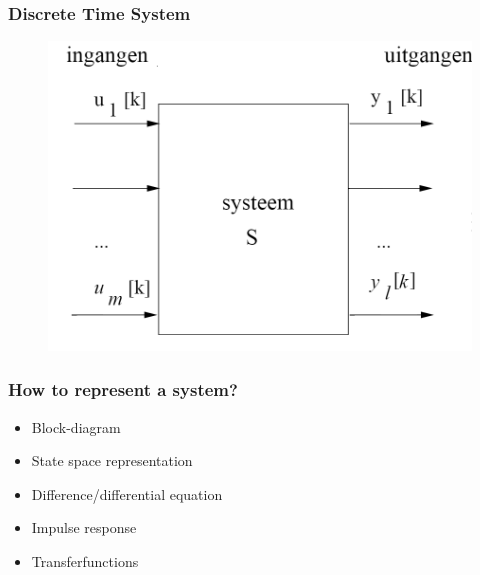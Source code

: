 \begin{frame}
	\frametitle{Discrete Time System}
		\begin{example}
			\begin{figure}
			\centering
			\includegraphics[height=0.7\textheight]{Images/discrete_time_systems_14}

			\label{fig:discrete_time_systems_14}
		\end{figure}

		\end{example}
\end{frame}
\begin{frame}
	\frametitle{How to represent a system?}
	\begin{itemize}
		\item Block-diagram
		\item State space representation
		\item Difference/differential equation
		\item Impulse response
		\item Transferfunctions
	\end{itemize}

\end{frame}
